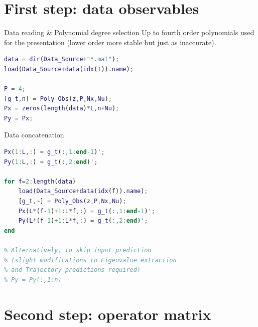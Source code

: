 \documentclass{beamer}
\begin{document}
\section{First step: data observables}

\begin{frame}[fragile]{Data reading \& Polynomial degree selection}
    Up to fourth order polynomials used for the presentation (lower order more stable but just as inaccurate).

    \begin{lstlisting}[language=Matlab]
data = dir(Data_Source+"*.mat");
load(Data_Source+data(idx(1)).name);

P = 4;
[g_t,n] = Poly_Obs(z,P,Nx,Nu);
Px = zeros(length(data)*L,n+Nu);
Py = Px;
    \end{lstlisting}
\end{frame}

\begin{frame}[fragile]{Data concatenation}
    \begin{lstlisting}[language=Matlab]
Px(1:L,:) = g_t(:,1:end-1)';
Py(1:L,:) = g_t(:,2:end)';

for f=2:length(data)
    load(Data_Source+data(idx(f)).name);
    [g_t,~] = Poly_Obs(z,P,Nx,Nu);
    Px(L*(f-1)+1:L*f,:) = g_t(:,1:end-1)';
    Py(L*(f-1)+1:L*f,:) = g_t(:,2:end)';
end

% Alternatively, to skip input prediction
% (slight modifications to Eigenvalue extraction
% and Trajectory predictions required)
% Py = Py(:,1:n)
    \end{lstlisting}
\end{frame}


\section{Second step: operator matrix}
\end{document}
